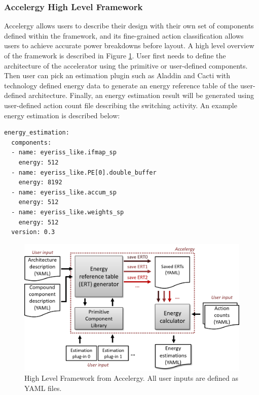 \documentclass[sigconf]{acmart}
\begin{document}
\subsubsection{Accelergy High Level Framework}
Accelergy allows users to describe their design with their own set of components defined within the framework, and its fine-grained action classification allows users to achieve accurate power breakdowns before layout. A high level overview of the framework is described in Figure \ref{fig:accelergy_high_level}. User first needs to define the architecture of the accelerator using the primitive or user-defined components. Then user can pick an estimation plugin such as Aladdin and Cacti with technology defined energy data to generate an energy reference table of the user-defined architecture. Finally, an energy estimation result will be generated using user-defined action count file describing the switching activity. An example energy estimation is described below:

\begin{verbatim}
energy_estimation:
  components:
  - name: eyeriss_like.ifmap_sp
    energy: 512
  - name: eyeriss_like.PE[0].double_buffer
    energy: 8192
  - name: eyeriss_like.accum_sp
    energy: 512
  - name: eyeriss_like.weights_sp
    energy: 512
  version: 0.3
\end{verbatim}

\begin{figure}
  \begin{center}
    \includegraphics[width=\linewidth]{high_level_framework.pdf}
  \end{center}
\caption{High Level Framework from Accelergy\cite{accelergy}. All user inputs are defined as YAML files.}
\label{fig:accelergy_high_level}
\end{figure}
\end{document}
